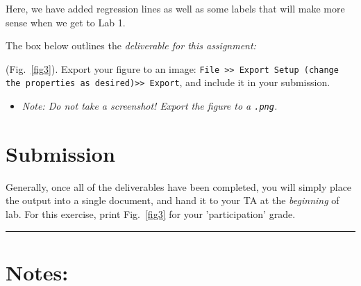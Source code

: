 \documentclass[11pt, letterpaper]{article}
\begin{document}
Here, we have added regression lines as well as some labels that will make more sense when we get to Lab 1.

\n
The box below outlines the \it{deliverable} for this assignment:

\begin{formal}
    \begin{deliv}  (Fig.~\ref{fig3}). Export your figure to an image: \texttt{File >> Export Setup (change the properties as desired)>> Export}, and include it in your submission.
    \end{deliv}
\end{formal}

\begin{itemize}
    \item \textit{Note: Do not take a screenshot! Export the figure to a \texttt{.png}.}
\end{itemize}

\section*{Submission}

Generally, once all of the deliverables have been completed, you will simply place the output into a single document, and hand it to your TA at the \textit{beginning} of lab. For this exercise, print Fig.~\ref{fig3} for your 'participation' grade.

\vspace{5mm}
\hrule

\newpage


\section*{Notes:}
\end{document}

